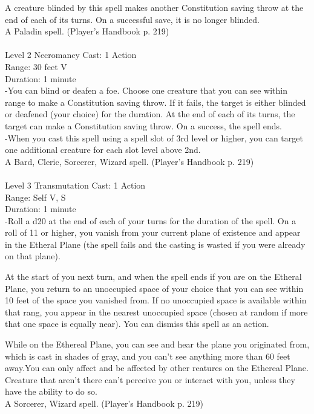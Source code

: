 \documentclass[10pt,twocolumn]{report}
\begin{document}
A creature blinded by this spell makes another Constitution saving throw at the end of each of its turns. On a successful save, it is no longer blinded.\\
A Paladin spell. (Player's Handbook p. 219) \\


 \\
Level 2 \quad Necromancy \quad Cast: 1 Action\\
Range: 30 feet \quad V\\
Duration: 1 minute \quad \\
-You can blind or deafen a foe. Choose one creature that you can see within range to make a Constitution saving throw. If it fails, the target is either blinded or deafened (your choice) for the duration. At the end of each of its turns, the target can make a Constitution saving throw. On a success, the spell ends.\\
-When you cast this spell using a spell slot of 3rd level or higher, you can target one additional creature for each slot level above 2nd.\\
A Bard, Cleric, Sorcerer, Wizard spell. (Player's Handbook p. 219) \\


 \\
Level 3 \quad Transmutation \quad Cast: 1 Action\\
Range: Self \quad V, S\\
Duration: 1 minute \quad \\
-Roll a d20 at the end of each of your turns for the duration of the spell. On a roll of 11 or higher, you vanish from your current plane of existence and appear in the Etheral Plane (the spell fails and the casting is wasted if you were already on that plane). 

At the start of you next turn, and when the spell ends if you are on the Etheral Plane, you return to an unoccupied space of your choice that you can see within 10 feet of the space you vanished from. If no unoccupied space is available within that rang, you appear in the nearest unoccupied space (chosen at random if more that one space is equally near). You can dismiss this spell as an action. 

While on the Ethereal Plane, you can see and hear the plane you originated from, which is cast in shades of gray, and you can’t see anything more than 60 feet away.You can only affect and be affected by other reatures on the Ethereal Plane. Creature that aren’t there can’t perceive you or interact with you, unless they have the ability to do so.\\
A Sorcerer, Wizard spell. (Player's Handbook p. 219) \\
\end{document}
